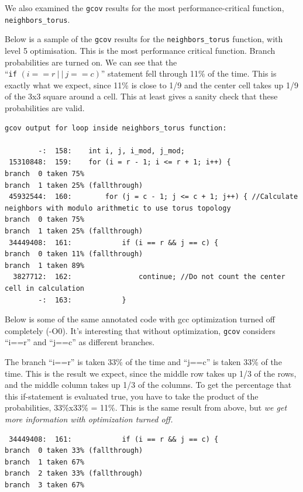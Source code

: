 \documentclass{article}
\begin{document}
We also examined the \verb=gcov= results for the most performance-critical function, \verb=neighbors_torus=. 

Below is a sample of the \verb=gcov= results for the \verb=neighbors_torus= function, with level 5 optimisation.
This is the most performance critical function. Branch probabilities are turned on.
    We can see that the \\ ``\verb=if= $(i==r \ | \ | \ j==c)$'' statement fell through 11\% of the time. This is exactly what we expect,
since 11\% is close to 1/9 and the center cell takes up 1/9 of the 3x3 square around a cell. This
at least gives a sanity check that these probabilities are valid.

\newpage

\begin{verbatim}
gcov output for loop inside neighbors_torus function:

        -:  158:    int i, j, i_mod, j_mod;
 15310848:  159:    for (i = r - 1; i <= r + 1; i++) {
branch  0 taken 75%
branch  1 taken 25% (fallthrough)
 45932544:  160:        for (j = c - 1; j <= c + 1; j++) { //Calculate neighbors with modulo arithmetic to use torus topology
branch  0 taken 75%
branch  1 taken 25% (fallthrough)
 34449408:  161:            if (i == r && j == c) {
branch  0 taken 11% (fallthrough)
branch  1 taken 89%
  3827712:  162:                continue; //Do not count the center cell in calculation
        -:  163:            }
\end{verbatim}

Below is some of the same annotated code with gcc optimization turned off completely (-O0).
It's interesting that without optimization, \verb=gcov= considers ``i==r'' and ``j==c'' as different branches.

The branch ``i==r'' is taken 33\% of the time and ``j==c'' is taken 33\% of the time. This is the result we expect, since the middle row takes up 1/3 of the rows, and the middle column takes up 1/3 of the columns.
    To get the percentage that this if-statement is evaluated true, you have to take the product of
the probabilities, 33\%x33\% = 11\%. This is the same result from above, but \emph{we get more information with
optimization turned off.}

\begin{verbatim}
 34449408:  161:            if (i == r && j == c) {
branch  0 taken 33% (fallthrough)
branch  1 taken 67%
branch  2 taken 33% (fallthrough)
branch  3 taken 67%
\end{verbatim}
\end{document}
